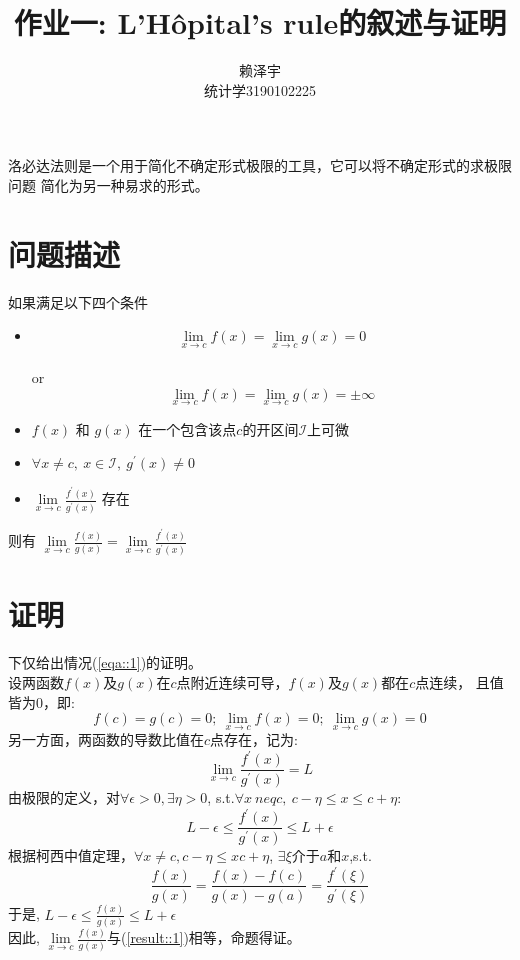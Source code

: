 \documentclass{ctexart}
\title{作业一: L'Hôpital's rule的叙述与证明}
\author{赖泽宇 \\ 统计学3190102225}
\begin{document}
\maketitle


洛必达法则是一个用于简化不确定形式极限的工具，它可以将不确定形式的求极限问题
简化为另一种易求的形式。
\section{问题描述}
如果满足以下四个条件
\begin{itemize}
    \item 
    \begin{equation}\label{eqa::1}
        \lim\limits_{x\to c}f(x)=\lim\limits_{x\to c}g(x) = 0 
    \end{equation}
        \\ or \\
    \begin{equation}\label{eqa::2} 
        \lim\limits_{x\to c}f(x)=\lim\limits_{x\to c}g(x) = \pm \infty 
    \end{equation}
    \item $f(x)$ 和 $g(x)$ 在一个包含该点$c$的开区间$\mathcal{I}$上可微
    \item $\forall x \neq c, \ x \in \mathcal{I}, \ g^{'}(x) \neq 0$
    \item $\lim\limits_{x\to c}\frac{f^{'}(x)}{g^{'}(x)}$ 存在
\end{itemize}
则有 $\lim\limits_{x \to c}\frac{f(x)}{g(x)} = \lim\limits_{x\to c}\frac{f^{'}(x)}{g^{'}(x)}$

\section{证明}
下仅给出情况(\ref{eqa::1})的证明。\\
设两函数$f(x)$及$g(x)$在$c$点附近连续可导，$f(x)$及$g(x)$都在$c$点连续，
且值皆为$0$，即:
$$
f(c) = g(c) = 0; \ \lim\limits_{x\to c}f(x) = 0; \ \lim\limits_{x\to c}g(x) = 0
$$
另一方面，两函数的导数比值在$c$点存在，记为:
\begin{equation}\label{result::1}
\lim\limits_{x\to c}\frac{f^{'}(x)}{g^{'}(x)} = L
\end{equation}
由极限的定义，对$\forall \epsilon > 0, \exists \eta > 0 $,
s.t.$\forall x\ neq c, \ c - \eta \leq x \leq c + \eta$:
$$
L - \epsilon \leq \frac{f^{'}(x)}{g^{'}(x)} \leq L + \epsilon 
$$
根据柯西中值定理，$\forall x\neq c, c - \eta \leq x c + \eta$, $\exists \xi $介于$a$和$x$,s.t.
\begin{equation}\label{eqa::3}
    \frac{f(x)}{g(x)} = \frac{f(x) - f(c)}{g(x) - g(a)} = \frac{f^{'}(\xi)}{g^{'}(\xi)}
\end{equation}
于是, $L-\epsilon \leq \frac{f(x)}{g(x)} \leq L + \epsilon$\\
因此, $\lim\limits_{x\to c}\frac{f(x)}{g(x)}$与(\ref{result::1})相等，命题得证。
\end{document}
